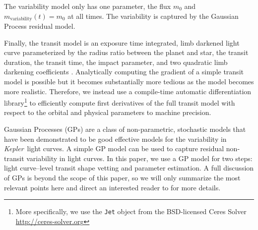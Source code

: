 \documentclass[manuscript, letterpaper]{aastex6}
\makeatletter
\let\origsection\section
\renewcommand\section{\@ifstar{\starsection}{\nostarsection}}
\newcommand\nostarsection[1]{\sectionprelude\origsection{#1}}
\newcommand\starsection[1]{\sectionprelude\origsection*{#1}}
\newcommand\sectionprelude{\vspace{1em}}
\newcommand{\project}[1]{\textsl{#1}}
\newcommand{\kepler}{\project{Kepler}}
\newcommand{\sectlabel}[1]{\label{sect:#1}}
\newcommand{\paper}{paper}
\newcommand{\modelname}[1]{{\textsf{#1}}}
\makeatother
\begin{document}
\begin{itemize}
{\item
The \modelname{variability} model only has one parameter, the flux $m_0$ and
$m_\mathrm{variability}(t) = m_0$ at all times.
The variability is captured by the Gaussian Process residual model.
}

{\item
Finally, the \modelname{transit} model is an exposure time integrated,
limb darkened light curve \citep{Mandel:2002, Kipping:2010} parameterized by
the radius ratio between the planet and star, the transit duration, the
transit time, the impact parameter, and two quadratic limb darkening
coefficients \citep{Kipping:2013}.
Analytically computing the gradient of a simple transit model is possible
\citep{Pal:2008} but it becomes substantially more tedious as the model
becomes more realistic.
Therefore, we instead use a compile-time automatic differentiation
library\footnote{More specifically, we use the \texttt{Jet} object from the
BSD-licensed Ceres Solver \url{http://ceres-solver.org}} \citep{Agarwal:2016}
to efficiently compute first derivatives of the full transit model with
respect to the orbital and physical parameters to machine precision.
}

\end{itemize}



\section{Gaussian process regression}\sectlabel{gp-regression}

Gaussian Processes (GPs) are a class of non-parametric, stochastic models that
have been demonstrated to be good effective models for the variability in
\kepler\ light curves.
A simple GP model can be used to capture residual non-transit variability in
light curves.
In this \paper, we use a GP model for two steps: light curve--level transit
shape vetting and parameter estimation.
A full discussion of GPs is beyond the scope of this \paper, so we will only
summarize the most relevant points here and direct an interested reader to
\citet{Rasmussen:2006} for more details.
\end{document}

